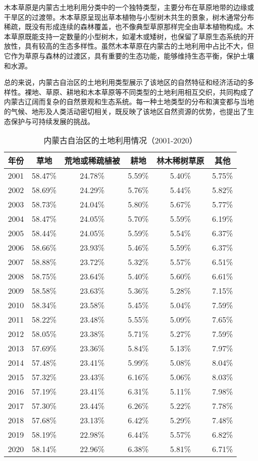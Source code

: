 \documentclass{article}
\begin{document}
		木本草原是内蒙古土地利用分类中的一个独特类型，主要分布在草原地带的边缘或干旱区的过渡带。木本草原呈现出草本植物与小型树木共生的景象，树木通常分布稀疏，既没有形成连续的森林覆盖，也不像典型草原那样完全由草本植物构成。木本草原既能支持一定数量的小型树木，如灌木或矮树，也保留了草原生态系统的开放性，具有较高的生态多样性。虽然木本草原在内蒙古的土地利用中占比不大，但它作为草原与森林的过渡区，具有重要的生态功能，能够维持生态平衡，保护土壤和水源。
		
		总的来说，内蒙古自治区的土地利用类型展示了该地区的自然特征和经济活动的多样性。裸地、草原、耕地和木本草原等不同类型的土地利用相互交织，共同构成了内蒙古辽阔而复杂的自然景观和生态系统。每一种土地类型的分布和演变都与当地的气候、地形及人类活动密切相关，既反映了该地区自然资源的优势，也提出了生态保护与可持续发展的挑战。
		
		\begin{table}[H]
			\centering
			\begin{tabular}{|c|c|c|c|c|c|}
				\hline
				年份 & 草地 & 荒地或稀疏植被 & 耕地 & 林木稀树草原 & 其他 \\
				\hline
				2001 & 58.47\% & 24.78\% & 5.59\% & 5.40\% & 5.75\% \\
				2002 & 58.69\% & 24.29\% & 5.76\% & 5.44\% & 5.82\% \\
				2003 & 58.73\% & 24.04\% & 5.80\% & 5.67\% & 5.77\% \\
				2004 & 58.47\% & 24.05\% & 5.70\% & 5.59\% & 6.19\% \\
				2005 & 58.44\% & 24.05\% & 5.59\% & 5.54\% & 6.37\% \\
				2006 & 58.66\% & 23.93\% & 5.46\% & 5.59\% & 6.37\% \\
				2007 & 58.88\% & 23.72\% & 5.32\% & 5.57\% & 6.51\% \\
				2008 & 58.75\% & 23.64\% & 5.40\% & 5.60\% & 6.61\% \\
				2009 & 58.58\% & 23.63\% & 5.36\% & 5.28\% & 7.15\% \\
				2010 & 58.34\% & 23.58\% & 5.45\% & 5.04\% & 7.59\% \\
				2011 & 58.22\% & 23.48\% & 5.55\% & 5.09\% & 7.65\% \\
				2012 & 58.05\% & 23.38\% & 5.71\% & 5.27\% & 7.59\% \\
				2013 & 57.69\% & 23.36\% & 5.84\% & 5.13\% & 7.97\% \\
				2014 & 57.48\% & 23.41\% & 5.99\% & 5.08\% & 8.04\% \\
				2015 & 57.32\% & 23.43\% & 6.16\% & 5.06\% & 8.03\% \\
				2016 & 57.19\% & 23.41\% & 6.31\% & 5.11\% & 7.98\% \\
				2017 & 57.30\% & 23.44\% & 6.26\% & 5.22\% & 7.78\% \\
				2018 & 57.68\% & 23.13\% & 6.42\% & 5.29\% & 7.48\% \\
				2019 & 58.19\% & 22.98\% & 6.44\% & 5.57\% & 6.82\% \\
				2020 & 58.14\% & 22.96\% & 6.38\% & 5.81\% & 6.71\% \\
				\hline
			\end{tabular}
			\caption{内蒙古自治区的土地利用情况（2001-2020）}
		\end{table}
		
\end{document}
